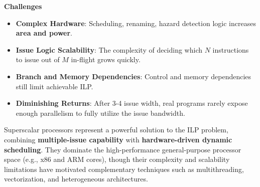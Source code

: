 \highspace
\begin{flushleft}
    \textcolor{Red2}{ \textbf{Challenges}}
\end{flushleft}
\begin{itemize}[label=\textcolor{Red2}{}]
    \item \textcolor{Red2}{\textbf{Complex Hardware}}: Scheduling, renaming, hazard detection logic increases \textbf{area and power}.
    \item \textcolor{Red2}{\textbf{Issue Logic Scalability}}: The complexity of deciding which $N$ instructions to issue out of $M$ in-flight grows quickly.
    \item \textcolor{Red2}{\textbf{Branch and Memory Dependencies}}: Control and memory dependencies still limit achievable ILP.
    \item \textcolor{Red2}{\textbf{Diminishing Returns}}: After 3-4 issue width, real programs rarely expose enough parallelism to fully utilize the issue bandwidth.
\end{itemize}

\highspace
Superscalar processors represent a powerful solution to the ILP problem, combining \textbf{multiple-issue capability} with \textbf{hardware-driven dynamic scheduling}. They dominate the high-performance general-purpose processor space (e.g., x86 and ARM cores), though their complexity and scalability limitations have motivated complementary techniques such as multithreading, vectorization, and heterogeneous architectures.